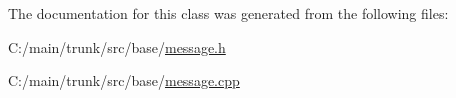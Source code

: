 The documentation for this class was generated from the following files:\begin{DoxyCompactItemize}
\item 
C:/main/trunk/src/base/\hyperlink{message_8h}{message.h}\item 
C:/main/trunk/src/base/\hyperlink{message_8cpp}{message.cpp}\end{DoxyCompactItemize}
